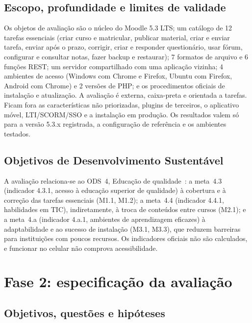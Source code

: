 \documentclass[12pt]{article}
\begin{document}
\subsection{Escopo, profundidade e limites de validade}

Os objetos de avaliação são o núcleo do Moodle 5.3 LTS; um catálogo de 12 tarefas essenciais (criar curso e matricular, publicar material, criar e enviar tarefa, enviar após o prazo, corrigir, criar e responder questionário, usar fórum, configurar e consultar notas, fazer backup e restaurar); 7 formatos de arquivo e 6 funções REST; um servidor compartilhado com uma aplicação vizinha; 4 ambientes de acesso (Windows com Chrome e Firefox, Ubuntu com Firefox, Android com Chrome) e 2 versões de PHP; e os procedimentos oficiais de instalação e atualização. A avaliação é externa, caixa-preta e orientada a tarefas. Ficam fora as características não priorizadas, plugins de terceiros, o aplicativo móvel, LTI/SCORM/SSO e a instalação em produção. Os resultados valem só para a versão 5.3.x registrada, a configuração de referência e os ambientes testados.

\subsection{Objetivos de Desenvolvimento Sustentável}

A avaliação relaciona-se ao ODS~4, Educação de qualidade~\cite{onu_ods4}: a meta~4.3 (indicador 4.3.1, acesso à educação superior de qualidade) à cobertura e à correção das tarefas essenciais (M1.1, M1.2); a meta~4.4 (indicador 4.4.1, habilidades em TIC), indiretamente, à troca de conteúdos entre cursos (M2.1); e a meta~4.a (indicador 4.a.1, ambientes de aprendizagem eficazes) à adaptabilidade e ao sucesso de instalação (M3.1, M3.3), que reduzem barreiras para instituições com poucos recursos. Os indicadores oficiais não são calculados, e funcionar no celular não comprova acessibilidade.

\section{Fase 2: especificação da avaliação}
\label{sec:fase2}

\subsection{Objetivos, questões e hipóteses}
\end{document}
